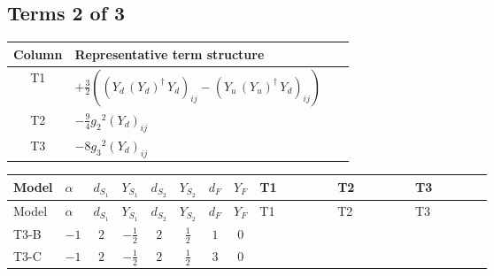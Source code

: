\documentclass[8pt]{article}
\begin{document}
\begin{landscape}
\subsection*{Terms 2 of 3}
\begin{center}
\begin{tabular}{@{}c >{\raggedright\arraybackslash}p{0.82\linewidth}@{}}
\toprule
Column & Representative term structure \\
\midrule
T1 & \(\displaystyle +\frac{3}{2} (\left({Y_d}\,\left({Y_d}\right)^{\dagger}\,{Y_d}\right)_{ij}-\left({Y_u}\,\left({Y_u}\right)^{\dagger}\,{Y_d}\right)_{ij})\) \\
\midrule
T2 & \(\displaystyle -\frac{9}{4} {g_2}^2 \left({Y_d}\right)_{ij}\) \\
\midrule
T3 & \(\displaystyle -8 {g_3}^2 \left({Y_d}\right)_{ij}\) \\
\midrule
\bottomrule
\end{tabular}
\end{center}
\smallskip
\tiny
\begin{longtable}{@{}llcccccc >{\raggedright\arraybackslash}p{0.21\linewidth} >{\raggedright\arraybackslash}p{0.21\linewidth} >{\raggedright\arraybackslash}p{0.21\linewidth}@{}}
\toprule
Model & $\alpha$ & $d_{S_1}$ & $Y_{S_1}$ & $d_{S_2}$ & $Y_{S_2}$ & $d_F$ & $Y_F$ & T1 & T2 & T3 \\
\midrule
\endfirsthead
\toprule
Model & $\alpha$ & $d_{S_1}$ & $Y_{S_1}$ & $d_{S_2}$ & $Y_{S_2}$ & $d_F$ & $Y_F$ & T1 & T2 & T3 \\
\midrule
\endhead
T3-B & $-1$ & $2$ & $-\frac{1}{2}$ & $2$ & $\frac{1}{2}$ & $1$ & $0$ & \scriptsize\adjustbox{max width=\linewidth}{$\begin{gathered} +\frac{3}{2} (\left({Y_d}\,\left({Y_d}\right)^{\dagger}\,{Y_d}\right)_{ij}-\left({Y_u}\,\left({Y_u}\right)^{\dagger}\,{Y_d}\right)_{ij})\end{gathered}$} & \scriptsize\adjustbox{max width=\linewidth}{$\begin{gathered} -\frac{9}{4} {g_2}^2 \left({Y_d}\right)_{ij}\end{gathered}$} & \scriptsize\adjustbox{max width=\linewidth}{$\begin{gathered} -8 {g_3}^2 \left({Y_d}\right)_{ij}\end{gathered}$} \\
\midrule
T3-C & $-1$ & $2$ & $-\frac{1}{2}$ & $2$ & $\frac{1}{2}$ & $3$ & $0$ & \scriptsize\adjustbox{max width=\linewidth}{$\begin{gathered} +\frac{3}{2} (\left({Y_d}\,\left({Y_d}\right)^{\dagger}\,{Y_d}\right)_{ij}-\left({Y_u}\,\left({Y_u}\right)^{\dagger}\,{Y_d}\right)_{ij})\end{gathered}$} & \scriptsize\adjustbox{max width=\linewidth}{$\begin{gathered} -\frac{9}{4} {g_2}^2 \left({Y_d}\right)_{ij}\end{gathered}$} & \scriptsize\adjustbox{max width=\linewidth}{$\begin{gathered} -8 {g_3}^2 \left({Y_d}\right)_{ij}\end{gathered}$} \\

\end{longtable}
\end{landscape}
\end{document}
